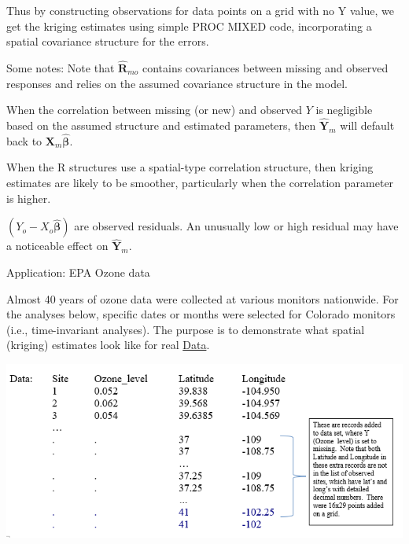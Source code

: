 \documentclass[
  9pt,
  ignorenonframetext,
]{beamer}
\begin{document}
\begin{frame}{}
\protect\hypertarget{section-10}{}
Thus by constructing observations for data points on a grid with no Y
value, we get the kriging estimates using simple PROC MIXED code,
incorporating a spatial covariance structure for the errors.

\begin{block}{Some notes:}
\protect\hypertarget{some-notes}{}
Note that \(\pmb {\hat R}_{mo}\) contains covariances between missing
and observed responses and relies on the assumed covariance structure in
the model.

When the correlation between missing (or new) and observed \(Y\) is
negligible based on the assumed structure and estimated parameters, then
\(\pmb {\hat Y}_m\) will default back to \(\pmb X_m \pmb {\hat \beta}\).

When the R structures use a spatial-type correlation structure, then
kriging estimates are likely to be smoother, particularly when the
correlation parameter is higher.

\((Y_o-X_o \pmb {\hat \beta})\) are observed residuals. An unusually low
or high residual may have a noticeable effect on \(\pmb {\hat Y}_m\).
\end{block}
\end{frame}

\begin{frame}{Application:}
\protect\hypertarget{application}{}
EPA Ozone data

Almost 40 years of ozone data were collected at various monitors
nationwide. For the analyses below, specific dates or months were
selected for Colorado monitors (i.e., time-invariant analyses). The
purpose is to demonstrate what spatial (kriging) estimates look like for
real
\href{https://aqs.epa.gov/aqsweb/airdata/daily_44201_2016.zip}{Data}.

\begin{center}\includegraphics[width=0.7\linewidth]{figs_L22/f2} \end{center}
\end{frame}
\end{document}
